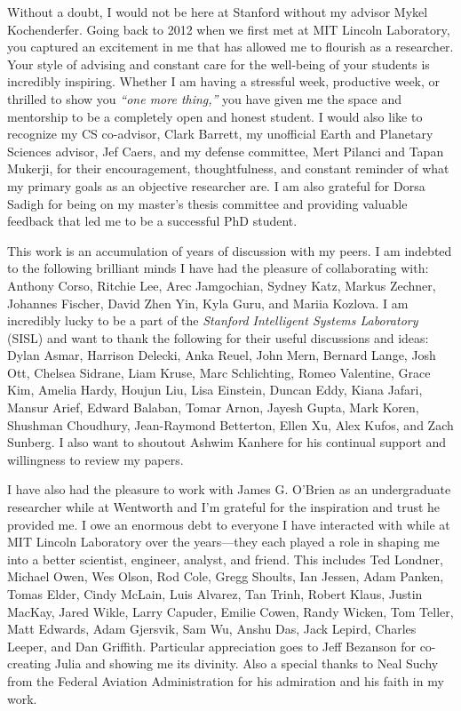 
Without a doubt, I would not be here at Stanford without my advisor Mykel Kochenderfer.
Going back to 2012 when we first met at MIT Lincoln Laboratory, you captured an excitement in me that has allowed me to flourish as a researcher.
Your style of advising and constant care for the well-being of your students is incredibly inspiring.
Whether I am having a stressful week, productive week, or thrilled to show you \textit{``one more thing,''} you have given me the space and mentorship to be a completely open and honest student.
I would also like to recognize my CS co-advisor, Clark Barrett, my unofficial Earth and Planetary Sciences advisor, Jef Caers, and my defense committee, Mert Pilanci and Tapan Mukerji, for their encouragement, thoughtfulness, and constant reminder of what my primary goals as an objective researcher are.
I am also grateful for Dorsa Sadigh for being on my master's thesis committee and providing valuable feedback that led me to be a successful PhD student.

This work is an accumulation of years of discussion with my peers.
I am indebted to the following brilliant minds I have had the pleasure of collaborating with:
Anthony Corso, Ritchie Lee, Arec Jamgochian, Sydney Katz, Markus Zechner, Johannes Fischer, David Zhen Yin, Kyla Guru, and Mariia Kozlova.
I am incredibly lucky to be a part of the \textit{Stanford Intelligent Systems Laboratory} (SISL) and want to thank the following for their useful discussions and ideas:
Dylan Asmar, Harrison Delecki, Anka Reuel, John Mern, Bernard Lange, Josh Ott, Chelsea Sidrane, Liam Kruse, Marc Schlichting, Romeo Valentine, Grace Kim, Amelia Hardy, Houjun Liu, Lisa Einstein, Duncan Eddy, Kiana Jafari, Mansur Arief, Edward Balaban, Tomar Arnon, Jayesh Gupta, Mark Koren, Shushman Choudhury, Jean-Raymond Betterton, Ellen Xu, Alex Kufos, and Zach Sunberg.
I also want to shoutout Ashwim Kanhere for his continual support and willingness to review my papers.

I have also had the pleasure to work with James G. O'Brien as an undergraduate researcher while at Wentworth and I'm grateful for the inspiration and trust he provided me.
I owe an enormous debt to everyone I have interacted with while at MIT Lincoln Laboratory over the years---they each played a role in shaping me into a better scientist, engineer, analyst, and friend.
This includes Ted Londner, Michael Owen, Wes Olson, Rod Cole, Gregg Shoults, Ian Jessen, Adam Panken, Tomas Elder, Cindy McLain, Luis Alvarez, Tan Trinh, Robert Klaus, Justin MacKay, Jared Wikle, Larry Capuder, Emilie Cowen, Randy Wicken, Tom Teller, Matt Edwards, Adam Gjersvik, Sam Wu, Anshu Das, Jack Lepird, Charles Leeper, and Dan Griffith.
Particular appreciation goes to Jeff Bezanson for co-creating Julia and showing me its divinity.
Also a special thanks to Neal Suchy from the Federal Aviation Administration for his admiration and his faith in my work.

